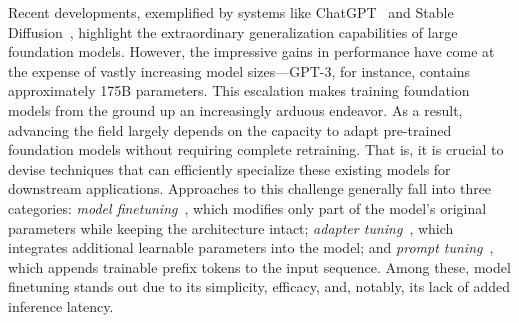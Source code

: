 Recent developments, exemplified by systems like ChatGPT~\cite{brown2020language,chen2021evaluating} and Stable Diffusion~\cite{rombach2022high}, highlight the extraordinary generalization capabilities of large foundation models. However, the impressive gains in performance have come at the expense of vastly increasing model sizes—GPT-3, for instance, contains approximately 175B parameters. This escalation makes training foundation models from the ground up an increasingly arduous endeavor. As a result, advancing the field largely depends on the capacity to adapt pre-trained foundation models without requiring complete retraining. That is, it is crucial to devise techniques that can efficiently specialize these existing models for downstream applications. Approaches to this challenge generally fall into three categories: \emph{model finetuning}~\cite{hulora2022,zaken2022bitfit,guo2020parameter,raffel2020exploring,qiu2023controlling,zhang2022adaptive,chavan2023one}, which modifies only part of the model’s original parameters while keeping the architecture intact; \emph{adapter tuning}~\cite{rebuffi2017learning,houlsby2019parameter,pfeiffer2020adapterfusion,lin2020exploring,he2021towards}, which integrates additional learnable parameters into the model; and \emph{prompt tuning}~\cite{li2021prefix,lester2021power}, which appends trainable prefix tokens to the input sequence. Among these, model finetuning stands out due to its simplicity, efficacy, and, notably, its lack of added inference latency.

